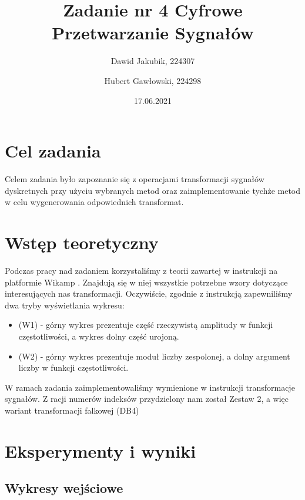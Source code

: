 \documentclass[12pt]{article}
\title{{\bf Zadanie nr 4}\linebreak
Cyfrowe Przetwarzanie Sygnałów}
\author{Dawid Jakubik, 224307 \and Hubert Gawłowski, 224298}
\date{17.06.2021}
\begin{document}
\clearpage\maketitle
\thispagestyle{empty}
\newpage
\setcounter{page}{1}
\section{Cel zadania}

Celem zadania było zapoznanie się z operacjami transformacji sygnałów dyskretnych przy użyciu wybranych metod oraz zaimplementowanie tychże metod w celu wygenerowania odpowiednich transformat.

\section{Wstęp teoretyczny}
Podczas pracy nad zadaniem korzystaliśmy z teorii zawartej w instrukcji na platformie Wikamp \cite{instrukcja}. Znajdują się w niej wszystkie potrzebne wzory dotyczące interesujących nas transformacji.
Oczywiście, zgodnie z instrukcją zapewniliśmy dwa tryby wyświetlania wykresu:
\begin{itemize}
    \item (W1) - górny wykres prezentuje część rzeczywistą amplitudy w funkcji częstotliwości, a wykres dolny część urojoną.
    \item (W2) - górny wykres prezentuje moduł liczby zespolonej, a dolny argument liczby w funkcji częstotliwości.
\end{itemize}
W ramach zadania zaimplementowaliśmy wymienione w instrukcji transformacje sygnałów. Z racji numerów indeksów przydzielony nam został Zestaw 2, a więc wariant transformacji falkowej (DB4)


\section{Eksperymenty i wyniki}


\subsection{Wykresy wejściowe}
\end{document}
